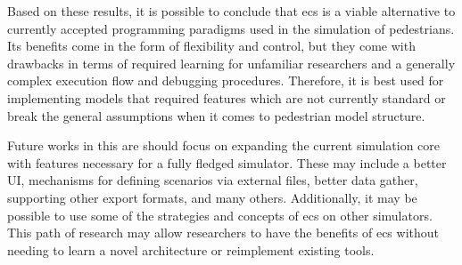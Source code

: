 \documentclass[twoside, 11pt]{article}
\begin{document}
Based on these results, it is possible to conclude that \gls{ecs} is a viable alternative to currently accepted programming paradigms used in the simulation of pedestrians. Its benefits come in the form of flexibility and control, but they come with drawbacks in terms of required learning for unfamiliar researchers and a generally complex execution flow and debugging procedures. Therefore, it is best used for implementing models that required features which are not currently standard or break the general assumptions when it comes to pedestrian model structure.

Future works in this are should focus on expanding the current simulation core with features necessary for a fully fledged simulator. These may include a better UI, mechanisms for defining scenarios via external files, better data gather, supporting other export formats, and many others. Additionally, it may be possible to use some of the strategies and concepts of \gls{ecs} on other simulators. This path of research may allow researchers to have the benefits of \gls{ecs} without needing to learn a  novel architecture or reimplement existing tools.

\printbibliography
\end{document}
